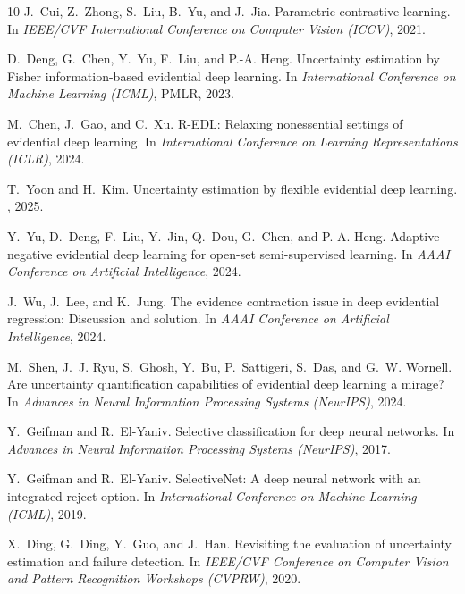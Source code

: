 \documentclass[letterpaper]{article} %
\begin{document}
\begin{thebibliography}{10}
J.~Cui, Z.~Zhong, S.~Liu, B.~Yu, and J.~Jia.
\newblock Parametric contrastive learning.
\newblock In {\em IEEE/CVF International Conference on Computer Vision (ICCV)}, 2021.

D.~Deng, G.~Chen, Y.~Yu, F.~Liu, and P.-A. Heng.
\newblock Uncertainty estimation by Fisher information-based evidential deep learning.
\newblock In {\em International Conference on Machine Learning (ICML)}, PMLR, 2023.

M.~Chen, J.~Gao, and C.~Xu.
\newblock R-EDL: Relaxing nonessential settings of evidential deep learning.
\newblock In {\em International Conference on Learning Representations (ICLR)}, 2024.

T.~Yoon and H.~Kim.
\newblock Uncertainty estimation by flexible evidential deep learning.
, 2025.

Y.~Yu, D.~Deng, F.~Liu, Y.~Jin, Q.~Dou, G.~Chen, and P.-A. Heng.
\newblock Adaptive negative evidential deep learning for open-set semi-supervised learning.
\newblock In {\em AAAI Conference on Artificial Intelligence}, 2024.

J.~Wu, J.~Lee, and K.~Jung.
\newblock The evidence contraction issue in deep evidential regression: Discussion and solution.
\newblock In {\em AAAI Conference on Artificial Intelligence}, 2024.

M.~Shen, J.~J. Ryu, S.~Ghosh, Y.~Bu, P.~Sattigeri, S.~Das, and G.~W. Wornell.
\newblock Are uncertainty quantification capabilities of evidential deep learning a mirage?
\newblock In {\em Advances in Neural Information Processing Systems (NeurIPS)}, 2024.

Y.~Geifman and R.~El-Yaniv.
\newblock Selective classification for deep neural networks.
\newblock In {\em Advances in Neural Information Processing Systems (NeurIPS)}, 2017.

Y.~Geifman and R.~El-Yaniv.
\newblock SelectiveNet: A deep neural network with an integrated reject option.
\newblock In {\em International Conference on Machine Learning (ICML)}, 2019.

X.~Ding, G.~Ding, Y.~Guo, and J.~Han.
\newblock Revisiting the evaluation of uncertainty estimation and failure detection.
\newblock In {\em IEEE/CVF Conference on Computer Vision and Pattern Recognition Workshops (CVPRW)}, 2020.


\end{thebibliography}
\end{document}
